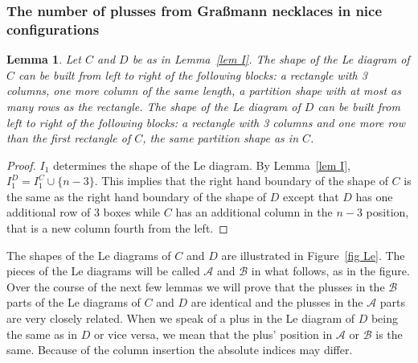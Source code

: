 \documentclass[11pt]{article}
\newtheorem{lem}[thm]{Lemma}
\theoremstyle{remark}
\theoremstyle{definition}
\begin{document}
\subsubsection{The number of plusses from Gra\ss mann necklaces in nice configurations}

\begin{lem}\label{lem shape}
  Let $C$ and $D$ be as in Lemma~\ref{lem I}.
  The shape of the Le diagram of $C$ can be built from left to right of the following blocks: a rectangle with 3 columns, one more column of the same length, a partition shape with at most as many rows as the rectangle.
  The shape of the Le diagram of $D$ can be built from left to right of the following blocks: a rectangle with 3 columns and one more row than the first rectangle of $C$, the same partition shape as in $C$.
\end{lem}

\begin{proof}
  $I_1$ determines the shape of the Le diagram.
  By Lemma~\ref{lem I}, $I_1^{D} = I_1^{C}\cup \{n-3\}$.  This implies that the right hand boundary of the shape of $C$ is the same as the right hand boundary of the shape of $D$ except that $D$ has one additional row of 3 boxes while $C$ has an additional column in the $n-3$ position, that is a new column fourth from the left.
\end{proof}

The shapes of the Le diagrams of $C$ and $D$ are illustrated in Figure~\ref{fig Le}.  The pieces of the Le diagrams will be called $\mathcal{A}$ and $\mathcal{B}$ in what follows, as in the figure.  Over the course of the next few lemmas we will prove that the plusses in the $\mathcal{B}$ parts of the Le diagrams of $C$ and $D$ are identical and the plusses in the $\mathcal{A}$ parts are very closely related.  When we speak of a plus in the Le diagram of $D$ being the same as in $D$ or vice versa, we mean that the plus' position in $\mathcal{A}$ or $\mathcal{B}$ is the same.  Because of the column insertion the absolute indices may differ.
\end{document}
